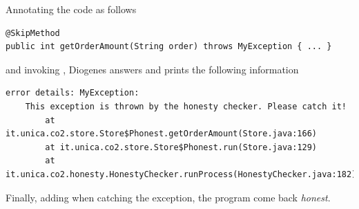 Annotating the code as follows
\begin{mdframed}
\begin{verbatim}
@SkipMethod
public int getOrderAmount(String order) throws MyException { ... }
\end{verbatim}
\end{mdframed}

and invoking ,
Diogenes answers  and prints the following information
\begin{mdframed}
\begin{verbatim}
error details: MyException: 
    This exception is thrown by the honesty checker. Please catch it!
        at it.unica.co2.store.Store$Phonest.getOrderAmount(Store.java:166)
        at it.unica.co2.store.Store$Phonest.run(Store.java:129)
        at it.unica.co2.honesty.HonestyChecker.runProcess(HonestyChecker.java:182)
\end{verbatim}
\end{mdframed}
Finally, adding  when catching the exception,
the program come back \emph{honest}.






